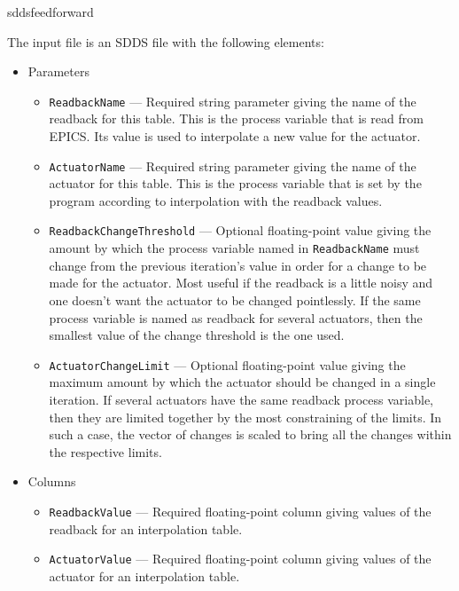 \begin{sddsprog}{sddsfeedforward}
\begin{itemize}
The input file is an SDDS file with the following elements:
\begin{itemize}
\item Parameters
\begin{itemize}
\item {\tt ReadbackName} --- Required string parameter giving the name of the
        readback for this table.  This is the process variable that is read from
        EPICS.  Its value is used to interpolate a new value for the actuator.
\item {\tt ActuatorName} --- Required string parameter giving the name of the
        actuator for this table.  This is the process variable that is set by
        the program according to interpolation with the readback values.
\item {\tt ReadbackChangeThreshold} --- Optional floating-point value giving
        the amount by which the process variable named in {\tt ReadbackName}
        must change from the previous iteration's value in order for a
        change to be made for the actuator.  Most useful if the readback is
        a little noisy and one doesn't want the actuator to be changed
        pointlessly.  If the same process variable is named as readback for
        several actuators, then the smallest value of the change threshold
        is the one used.
\item {\tt ActuatorChangeLimit} --- Optional floating-point value giving 
        the maximum amount by which the actuator should be changed in a
        single iteration.  If several actuators have the same
        readback process variable, then they are limited together by the
        most constraining of the limits.  In such a case, the vector of
        changes is scaled to bring all the changes within the respective
        limits.
\end{itemize}
\item Columns
\begin{itemize}
\item {\tt ReadbackValue} --- Required floating-point column giving values
        of the readback for an interpolation table.
\item {\tt ActuatorValue} --- Required floating-point column giving values
        of the actuator for an interpolation table.
\end{itemize}
\end{itemize}


\end{itemize}
\end{sddsprog}
